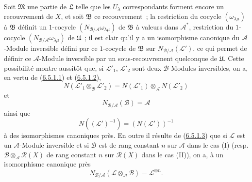 \begin{env}[6.5.2]
Soit $\mathfrak{M}$ une partie de $\mathfrak{L}$ telle que les $U_\lambda$
correspondants forment encore un recouvrement de $X$, et soit $\mathfrak{B}$
ce recouvrement~; la restriction du cocycle $(\omega_{\lambda\mu})$ à
$\mathfrak{B}$ définit un $1$-cocycle
$(N_{\mathcal{B}/\mathcal{A}}\omega_{\lambda\mu})$ de $\mathfrak{B}$ à
valeurs dans $\mathcal{A}^*$, restriction du $1$-cocycle
$(N_{\mathcal{B}/\mathcal{A}}\omega_{\lambda\mu})$ de $\mathfrak{U}$~; il est
clair qu'il y a un isomorphisme canonique du $\mathcal{A}$-Module inversible
défini par ce $1$-cocycle de $\mathfrak{B}$ sur
$N_{\mathcal{B}/\mathcal{A}}(\mathcal{L}')$, ce qui permet de définir ce
$\mathcal{A}$-Module inversible par un sous-recouvrement quelconque de
$\mathfrak{U}$. Cette possibilité montre aussitôt que, si
$\mathcal{L}'_1$, $\mathcal{L}'_2$ sont deux $\mathcal{B}$-Modules inversibles,
on a, en vertu de (\hyperref[II.6.5.1.1-fr]{6.5.1.1}) et
(\hyperref[II.6.5.1.2-fr]{6.5.1.2}),
\[
\label{II.6.5.2.1-fr}
N(\mathcal{L}'_1\otimes_{\mathcal{B}}\mathcal{L}'_2)
=N(\mathcal{L}'_1)\otimes_{\mathcal{A}}N(\mathcal{L}'_2)
\tag{6.5.2.1}
\]
et
\[
\label{II.6.5.2.2-fr}
N_{\mathcal{B}/\mathcal{A}}(\mathcal{B})=\mathcal{A}
\tag{6.5.2.2}
\]
ainsi que
\[
\label{II.6.5.2.3-fr}
N((\mathcal{L}')^{-1})=(N(\mathcal{L}'))^{-1}
\tag{6.5.2.3}
\]
à des isomorphismes canoniques près. En outre il résulte de
(\hyperref[II.6.5.1.3-fr]{6.5.1.3}) que si $\mathcal{L}$ est un
$\mathcal{A}$-Module inversible et si $\mathcal{B}$ est de rang constant $n$
sur $\mathcal{A}$ dans le cas (I) (resp.
$\mathcal{B}\otimes_{\mathcal{A}}\mathcal{R}(X)$ de rang constant $n$ sur
$\mathcal{R}(X)$ dans le cas (II)), on a, à un isomorphisme canonique près
\[
\label{II.6.5.2.4-fr}
N_{\mathcal{B}/\mathcal{A}}(\mathcal{L}\otimes_{\mathcal{A}}\mathcal{B})
=\mathcal{L}^{\otimes n}.
\tag{6.5.2.4}
\]
\end{env}

